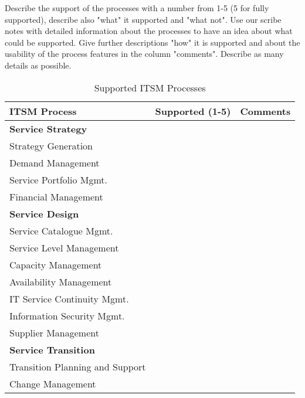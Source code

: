 Describe the support of the processes with a number from 1-5 (5 for fully supported), describe also "what" it supported and "what not". Use our scribe notes with detailed information about the processes to have an idea about what could be supported. Give further descriptions "how" it is supported and about the usability of the process features in the column "comments". Describe as many details as possible.

\begin{table}[h!]
\caption{Supported ITSM Processes}
\vspace*{0.3cm}
\begin{tabular}{|p{6.1cm}|p{4.5cm}|p{4.5cm}|}\hline
\textbf{ITSM Process}             &\textbf{Supported (1-5)}        &\textbf{Comments}\\\hline\hline
\textbf{Service Strategy}          &                                &\\
Strategy Generation            &                                &\\
Demand Management                   &                                &\\
Service Portfolio Mgmt.                   &                                &\\
Financial Management                   &                                &\\\hline
\textbf{Service Design}          &                                &\\
Service Catalogue Mgmt.                   &                                &\\
Service Level Management                   &                                &\\
Capacity Management                   &                                &\\
Availability Management                   &                                &\\
IT Service Continuity Mgmt.                   &                                &\\
Information Security Mgmt.                   &                                &\\
Supplier Management                   &                                &\\\hline
\textbf{Service Transition}          &                                &\\
Transition Planning and Support                   &                                &\\
Change Management                   &                                &\\

\end{tabular}
\end{table}
